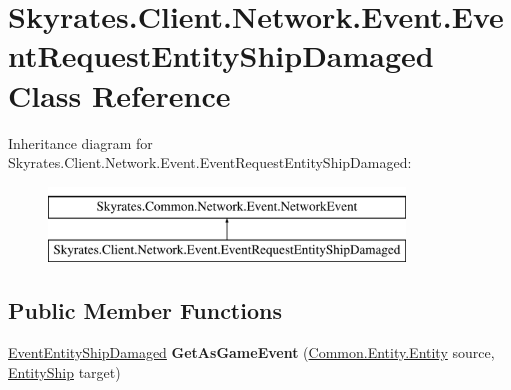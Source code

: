 \hypertarget{class_skyrates_1_1_client_1_1_network_1_1_event_1_1_event_request_entity_ship_damaged}{\section{Skyrates.\-Client.\-Network.\-Event.\-Event\-Request\-Entity\-Ship\-Damaged Class Reference}
\label{class_skyrates_1_1_client_1_1_network_1_1_event_1_1_event_request_entity_ship_damaged}
}
Inheritance diagram for Skyrates.\-Client.\-Network.\-Event.\-Event\-Request\-Entity\-Ship\-Damaged\-:\begin{figure}[H]
\begin{center}
\leavevmode
\includegraphics[height=2.000000cm]{class_skyrates_1_1_client_1_1_network_1_1_event_1_1_event_request_entity_ship_damaged}
\end{center}
\end{figure}
\subsection*{Public Member Functions}
\begin{DoxyCompactItemize}
\item 
\hypertarget{class_skyrates_1_1_client_1_1_network_1_1_event_1_1_event_request_entity_ship_damaged_a20305bfb7f9e9e58479c3dc66701a59b}{\hyperlink{class_skyrates_1_1_client_1_1_game_1_1_event_1_1_event_entity_ship_damaged}{Event\-Entity\-Ship\-Damaged} {\bfseries Get\-As\-Game\-Event} (\hyperlink{class_skyrates_1_1_common_1_1_entity_1_1_entity}{Common.\-Entity.\-Entity} source, \hyperlink{class_skyrates_1_1_client_1_1_entity_1_1_entity_ship}{Entity\-Ship} target)}\label{class_skyrates_1_1_client_1_1_network_1_1_event_1_1_event_request_entity_ship_damaged_a20305bfb7f9e9e58479c3dc66701a59b}

\end{DoxyCompactItemize}
